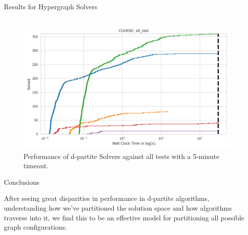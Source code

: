 \documentclass[final]{beamer}
\newlength{\onecolwid}
\begin{document}
\begin{columns}[t]
\begin{column}{\onecolwid}
\begin{block}{Results for Hypergraph Solvers}
\begin{table}
\begin{tabular}{| l| c | c | c | c |}
        \bottomrule
        \end{tabular}

        \end{table}
        \begin{figure}[h]
          \begin{center}
            \includegraphics[width=1\linewidth]{figs/d/all_test.png}

            \caption{Performance of d-partite Solvers against all tests with a 5-minute timeout.}
            \end{center}
        \end{figure}
      \end{block}

      
      \begin{block}{Conclusions}

        After seeing great disparities in performance in d-partite algorithms, understanding how we've partitioned the solution space and how algorithms traverse into it, we find this to be an effective model for partitioning all possible graph configurations.
        
      
        
        

\end{block}
\end{column}
\end{columns}
\end{document}
